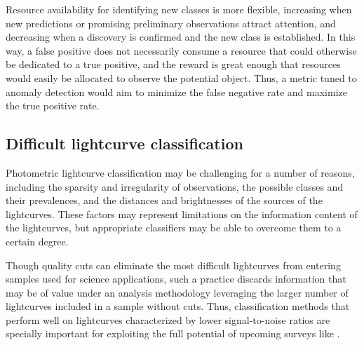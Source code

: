 Resource availability for identifying new classes is more flexible, increasing when new predictions or promising preliminary observations attract attention, and decreasing when a discovery is confirmed and the new class is established.
In this way, a false positive does not necessarily consume a resource that could otherwise be dedicated to a true positive, and the reward is great enough that resources would easily be allocated to observe the potential object.
Thus, a metric tuned to anomaly detection would aim to minimize the false negative rate and maximize the true positive rate.

%

\subsection{Difficult lightcurve classification}
\label{sec:difficult}

Photometric lightcurve classification may be challenging for a number of reasons, including the sparsity and irregularity of observations, the possible classes and their prevalences, and the distances and brightnesses of the sources of the lightcurves.
These factors may represent limitations on the information content of the lightcurves, but appropriate classifiers may be able to overcome them to a certain degree.

Though quality cuts can eliminate the most difficult lightcurves from entering samples used for science applications, such a practice discards information that may be of value under an analysis methodology leveraging the larger number of lightcurves included in a sample without cuts.
Thus, classification methods that perform well on lightcurves characterized by lower signal-to-noise ratios are specially important for exploiting the full potential of upcoming surveys like \lsst.

